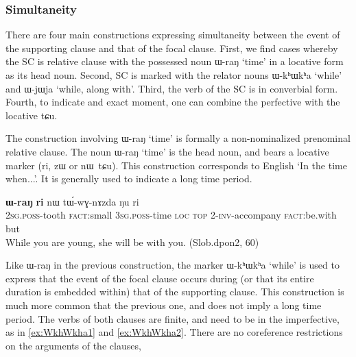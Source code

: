 \documentclass[oldfontcommands,oneside,a4paper,11pt]{article}
\newcommand{\ipa}[1]{{\phon \mbox{#1}}} %
\begin{document}
	

 

\subsubsection{Simultaneity} \label{sec:simultaneity}





There are four main constructions  expressing simultaneity between the event of the supporting clause and that of the focal clause. First, we find cases whereby the SC is relative clause with the possessed noun \ipa{ɯ-raŋ} `time' in a locative form as its head noun. Second, SC is marked with  the relator nouns \ipa{ɯ-kʰɯkʰa} `while' and \ipa{ɯ-jɯja} `while, along with'.  Third, the verb of the SC is in  converbial form. Fourth, to indicate and exact moment, one can combine the perfective with the locative \ipa{tɕu}.


The construction involving \ipa{ɯ-raŋ} `time' is formally a non-nominalized prenominal relative clause.  The noun  \ipa{ɯ-raŋ} `time' is the head noun, and bears  a locative marker (\ipa{ri}, \ipa{zɯ} or \ipa{nɯ tɕu}). This construction corresponds to English `In the time when...'. It is generally used to indicate a long time period.

\begin{exe}
   \ex \label{ex:WraN2}
 \gll [\ipa{nɤ-ɕɣa}   	\ipa{xtɕi}]   	\textbf{\ipa{ɯ-raŋ}}   	\textbf{\ipa{ri}}   	\ipa{nɯ}   	\ipa{tɯ́-wɣ-nɤzda}   	\ipa{ŋu}   	\ipa{ri}   \\
 \textsc{2sg.poss}-tooth \textsc{fact}:small \textsc{3sg.poss}-time \textsc{loc} \textsc{top} 2-\textsc{inv}-accompany \textsc{fact}:be.with but \\
\glt While you are young, she will be with you. (Slob.dpon2, 60)
\end{exe}

Like \ipa{ɯ-raŋ} in the previous construction, the marker  \ipa{ɯ-kʰɯkʰa} `while'  is used to express  that the event of the focal clause occurs during (or that its entire duration is embedded within) that of the supporting clause. This construction is much more common that the previous one, and does not imply a long time period.  The verbs of both clauses are finite, and need to be in the imperfective, as in \ref{ex:WkhWkha1} and \ref{ex:WkhWkha2}. There are no coreference restrictions on the arguments of the clauses, 
\end{document}
